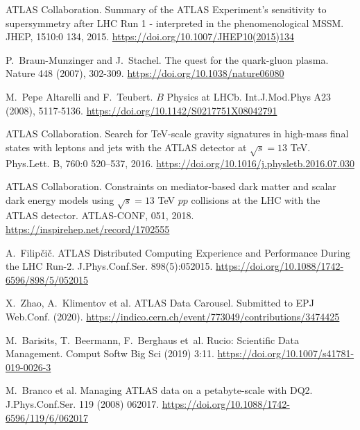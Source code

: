 \documentclass[11pt]{article}
\begin{document}
\begin{thebibliography}{99}
\begin{small}
ATLAS Collaboration.
\newblock Summary of the ATLAS Experiment's sensitivity to supersymmetry after LHC Run 1 - interpreted in the phenomenological MSSM.
\newblock JHEP, 1510:0 134, 2015.
\newblock \href{https://doi.org/10.1007/JHEP10(2015)134}{https://doi.org/10.1007/JHEP10(2015)134}

P.~Braun-Munzinger and J.~Stachel.
\newblock The quest for the quark-gluon plasma.
\newblock Nature 448 (2007), 302-309.
\newblock \href{https://doi.org/10.1038/nature06080}{https://doi.org/10.1038/nature06080}

M.~Pepe Altarelli and F.~Teubert.
\newblock $B$ Physics at LHCb.
\newblock Int.J.Mod.Phys A23 (2008), 5117-5136.
\newblock \href{https://doi.org/10.1142/S0217751X08042791}{https://doi.org/10.1142/S0217751X08042791}

ATLAS Collaboration.
\newblock Search for TeV-scale gravity signatures in high-mass final states with leptons and jets with the ATLAS detector at $\sqrt{s}=13$ TeV.
\newblock Phys.Lett. B, 760:0 520--537, 2016.
\newblock \href{https://doi.org/10.1016/j.physletb.2016.07.030}{https://doi.org/10.1016/j.physletb.2016.07.030}

ATLAS Collaboration.
\newblock Constraints on mediator-based dark matter and scalar dark energy models using $\sqrt{s} = 13$ TeV $pp$ collisions at the LHC with the ATLAS detector.
\newblock ATLAS-CONF, 051, 2018.
\newblock \href{https://inspirehep.net/record/1702555}{https://inspirehep.net/record/1702555}

A.~Filipčič.
\newblock ATLAS Distributed Computing Experience and Performance During the LHC Run-2.
\newblock J.Phys.Conf.Ser. 898(5):052015.
\newblock \href{https://doi.org/10.1088/1742-6596/898/5/052015}{https://doi.org/10.1088/1742-6596/898/5/052015}

X.~Zhao, A.~Klimentov et al.
\newblock ATLAS Data Carousel.
\newblock Submitted to EPJ Web.Conf. (2020).
\newblock \href{https://indico.cern.ch/event/773049/contributions/3474425/}{https://indico.cern.ch/event/773049/contributions/3474425}

M.~Barisits, T.~Beermann, F.~Berghaus et~al.
\newblock Rucio: Scientific Data Management.
\newblock Comput Softw Big Sci (2019) 3:11.
\newblock \href{https://doi.org/10.1007/s41781-019-0026-3}{https://doi.org/10.1007/s41781-019-0026-3}

M.~Branco et al.
\newblock Managing ATLAS data on a petabyte-scale with DQ2.
\newblock J.Phys.Conf.Ser. 119 (2008) 062017.
\newblock \href{https://doi.org/10.1088/1742-6596/119/6/062017}{https://doi.org/10.1088/1742-6596/119/6/062017}


\end{small}
\end{thebibliography}
\end{document}
